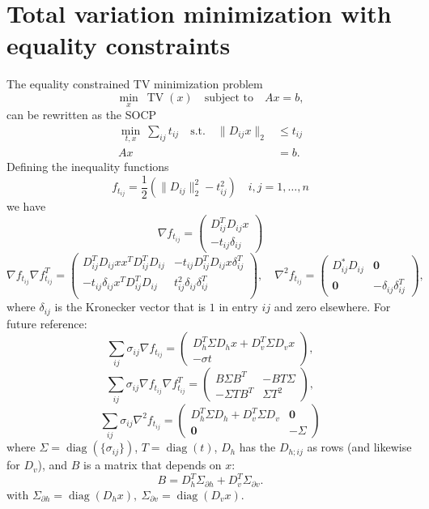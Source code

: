 \documentclass{article}
\newcommand{\bpm}{\left(\begin{matrix}}
\newcommand{\epm}{\end{matrix}\right)}
\newcommand{\grad}{\nabla}
\newcommand{\<}{\langle}
\renewcommand{\>}{\rangle}
\newcommand{\diag}{\operatorname{diag}}
\newcommand{\vzero}{\mathbf{0}}
\begin{document}
\section{Total variation minimization with equality constraints}
\label{sec:tveq}

The equality constrained TV minimization problem
\[
\min_{x}~\operatorname{TV}(x)\quad\text{subject~to}\quad Ax=b,
\]
can be rewritten as the SOCP
\begin{align*}
\min_{t,x}~\sum_{ij} t_{ij} \quad\text{s.t.}\quad \|D_{ij}x\|_2 & \leq t_{ij} \\[-2mm]
 Ax &= b. 
\end{align*}
Defining the inequality functions
\begin{equation}
\label{eq:ftij}
f_{t_{ij}} = \frac{1}{2}\left(\|D_{ij}\|_2^2 - t^2_{ij}\right)\quad i,j=1,\ldots,n
\end{equation}
we have 
\[
\grad f_{t_{ij}} =
\left( \begin{array}{c} D^T_{ij}D_{ij} x \\ -t_{ij}\delta_{ij} \end{array}\right)
\]
\[
\grad f_{t_{ij}} \grad f_{t_{ij}}^T =
\bpm D^T_{ij}D_{ij} xx^TD^T_{ij}D_{ij} & 
-t_{ij}D^T_{ij}D_{ij}x\delta_{ij}^T \\
-t_{ij}\delta_{ij}x^T D^T_{ij}D_{ij} & 
t_{ij}^2\delta_{ij}\delta_{ij}^T \\
\epm,\quad
\grad^2 f_{t_{ij}} = 
\bpm D_{ij}^*D_{ij} & \vzero \\
\vzero & -\delta_{ij}\delta_{ij}^T 
\epm,
\]
where $\delta_{ij}$ is the Kronecker vector that is $1$ in entry $ij$ and zero elsewhere.
For future reference:
\[
\sum_{ij}\sigma_{ij} \grad f_{t_{ij}} = 
\bpm D_h^T\Sigma D_h x + D_v^T\Sigma D_v x \\ -\sigma t\epm,
\]
\[
\sum_{ij} \sigma_{ij} \grad f_{t_{ij}} \grad f_{t_{ij}}^T = 
\left(\begin{array}{cc}
B\Sigma B^T & -BT\Sigma  \\ -\Sigma TB^T & \Sigma T^2 
\end{array}\right),
\]
\[
\sum_{ij} \sigma_{ij} \grad^2 f_{t_{ij}} = 
\left(\begin{array}{cc}
D_h^T \Sigma D_h + D_v^T \Sigma D_v & \vzero \\ \vzero & -\Sigma
\end{array}\right)
\]
where $\Sigma = \diag(\{\sigma_{ij}\})$, $T = \diag(t)$, $D_h$ has the $D_{h;ij}$ as rows (and likewise for $D_v$), and  $B$ is a matrix that depends on $x$:
\[
B = D_h^T\Sigma_{\partial h} + D_v^T\Sigma_{\partial v}.
\]
with $\Sigma_{\partial h} = \diag(D_h x),~ \Sigma_{\partial v} = \diag(D_v x)$.
\end{document}
